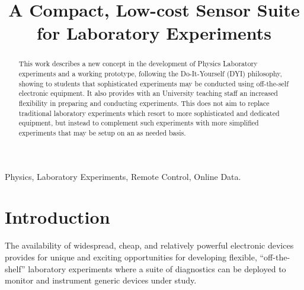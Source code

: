 \documentclass[conference]{IEEEtran}
\begin{document}
\title{A Compact, Low-cost Sensor Suite  for Laboratory Experiments
}

\author{
\and
{}
\and
{}
}

\maketitle

\begin{abstract}
This work describes a new concept in the development of Physics Laboratory experiments and a working prototype, following the Do-It-Yourself (DYI) philosophy,
showing to students that sophisticated experiments may be conducted using off-the-self electronic equipment.
It also provides with an University teaching staff an increased flexibility in preparing and conducting experiments. 
This does not aim to replace traditional laboratory experiments which resort to more sophisticated and dedicated equipment,
but instead to complement such experiments with more simplified experiments that may be setup on an as needed basis.

\end{abstract}

\begin{IEEEkeywords}
Physics, Laboratory Experiments, Remote Control, Online Data.
\end{IEEEkeywords}

\section{Introduction}
The availability of widespread, cheap, and relatively powerful electronic devices provides for unique and exciting opportunities for developing flexible, ``off-the-shelf'' laboratory experiments where a suite of diagnostics can be deployed to monitor and instrument generic devices under study.
\end{document}
